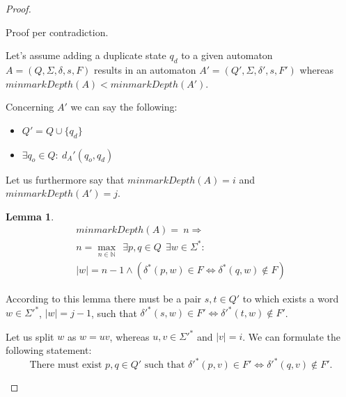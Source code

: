 \documentclass[a4paper, oneside, 11pt]{report}
\newtheorem{lemma}{Lemma}
\theoremstyle{definition}
\theoremstyle{remark}
\begin{document}
\begin{proof}
	\begin{description}
		\item
		
		Proof per contradiction.
		
		Let's assume adding a duplicate state $q_d$ to a given automaton $A = (Q, \Sigma, \delta, s, F)$ results in an automaton $A' = (Q', \Sigma, \delta', s, F')$ whereas $minmarkDepth(A) < minmarkDepth(A')$.
		
		Concerning $A'$ we can say the following:
		\begin{itemize}
			\item $Q' = Q \cup \{ q_d \}$
			\item $\exists q_o \in Q \colon\ d_A'(q_o, q_d)$
		\end{itemize}
		Let us furthermore say that $minmarkDepth(A) = i$ and $minmarkDepth(A') = j$.
		
		\begin{lemma}
			\begin{multline*}
			minmarkDepth(A) =\ n \Rightarrow \\
			n = \max_{n \in \mathbb{N}}\ \ \exists p, q \in Q\ \ \exists w \in \Sigma^* \colon \\
			|w| = n - 1 \land (\delta^*(p,w) \in F \Leftrightarrow \delta^*(q,w) \notin F)
			\end{multline*}
		\end{lemma}
		According to this lemma there must be a pair $s, t \in Q'$ to which exists a word $w \in \Sigma'^*$, $|w| = j - 1$, such that $\delta'^*(s,w) \in F' \Leftrightarrow \delta'^*(t,w) \notin F'$.
		
		Let us split $w$ as $w = uv$, whereas $u,v \in\Sigma'^*$ and $|v| = i$. We can formulate the following statement:
		\begin{equation}
		\text{There must exist }p, q \in Q'\text{ such that }\delta'^*(p,v) \in F' \Leftrightarrow \delta'^*(q,v) \notin F'.
		\end{equation}
		
		

\end{description}
\end{proof}
\end{document}
